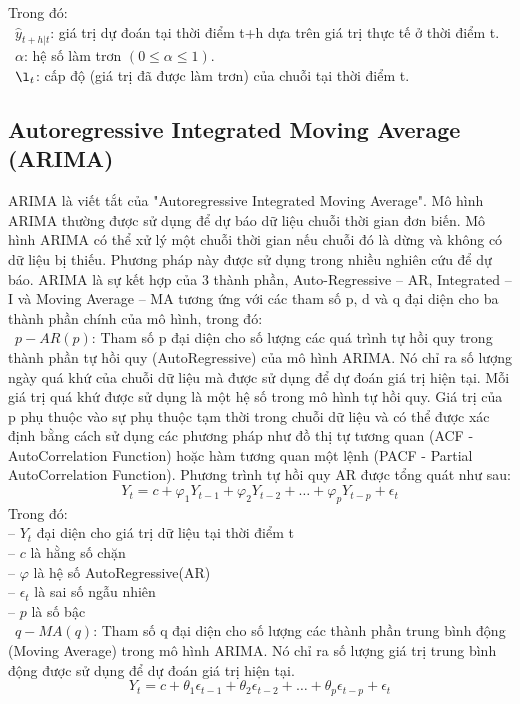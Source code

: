 \documentclass[conference]{IEEEtran}
\begin{document}
Trong đó:\\
\indent\textbullet\ \(\hat{y}_{t+h|t} \): giá trị dự đoán tại thời điểm t+h dựa trên giá trị thực tế ở thời điểm t.\\
\indent\textbullet\ \(\alpha\): hệ số làm trơn \((0\le\alpha\le1)\).\\
\indent\textbullet\ \(\l_t \): cấp độ (giá trị đã được làm trơn) của chuỗi tại thời điểm t.\\


\subsection{Autoregressive Integrated Moving Average (ARIMA)}

ARIMA là viết tắt của "Autoregressive Integrated Moving Average". Mô hình ARIMA thường được sử dụng để dự báo dữ liệu chuỗi thời gian đơn biến. Mô hình ARIMA có thể xử lý một chuỗi thời gian nếu chuỗi đó là dừng và không có dữ liệu bị thiếu. Phương pháp này được sử dụng trong nhiều nghiên cứu để dự báo. ARIMA là sự kết hợp của 3 thành phần, Auto-Regressive – AR, Integrated – I và Moving Average – MA tương ứng với các tham số p, d và q đại diện cho ba thành phần chính của mô hình, trong đó:
\\
\indent\textbullet\ \(p-AR(p)\): Tham số p đại diện cho số lượng các quá trình tự hồi quy trong thành phần tự hồi quy (AutoRegressive) của mô hình ARIMA. Nó chỉ ra số lượng ngày quá khứ của chuỗi dữ liệu mà được sử dụng để dự đoán giá trị hiện tại. Mỗi giá trị quá khứ được sử dụng là một hệ số trong mô hình tự hồi quy. Giá trị của p phụ thuộc vào sự phụ thuộc tạm thời trong chuỗi dữ liệu và có thể được xác định bằng cách sử dụng các phương pháp như đồ thị tự tương quan (ACF - AutoCorrelation Function) hoặc hàm tương quan một lệnh (PACF - Partial AutoCorrelation Function). Phương trình tự hồi quy AR được tổng quát như sau:\\
\[
    Y_t = c + \varphi_1 Y_{t-1} + \varphi_2 Y_{t-2} + \ldots + \varphi_p Y_{t-p} + \epsilon_t
\]
Trong đó: \\
\indent -- \(Y_t\) đại diện cho giá trị dữ liệu tại thời điểm t\\
\indent -- \(c\) là hằng số chặn\\
\indent -- \(\varphi\) là hệ số AutoRegressive(AR)\\
\indent -- \(\epsilon_t\) là sai số ngẫu nhiên \\
\indent -- \(p\) là số bậc \\

\indent\textbullet\ \(q-MA(q)\): Tham số q đại diện cho số lượng các thành phần trung bình động (Moving Average) trong mô hình ARIMA. Nó chỉ ra số lượng giá trị trung bình động được sử dụng để dự đoán giá trị hiện tại.\\
\[
    Y_t = c + \theta_1 \epsilon_{t-1} + \theta_2 \epsilon_{t-2} + \ldots + \theta_p \epsilon_{t-p} + \epsilon_t
\]
\end{document}
